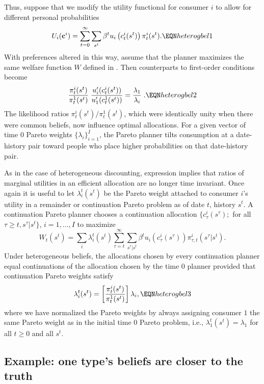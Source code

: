 Thus, suppose that we modify  the utility functional  for consumer $i$
to allow for different personal probabilities
$$ U_i({\bf c}^i) = \sum_{t=0}^\infty \sum_{s^t} \beta^t 
   u_i\left(c^i_t(s^t)\right)
\pi_t^i(s^t) .  \EQN heterogbel1 $$
With preferences altered in this way, assume that the planner
maximizes the same welfare function $W$ defined in .    Then  counterparts to first-order conditions  become
$$ {\frac{\pi_t^i(s^t)}{\pi_t^1(s^t)}} \;
{\frac{u_i^\prime(c^i_t(s^t))}{u_1^\prime(c^1_t(s^t))}}
 = {\frac{\lambda_1}{\lambda_i}} \; .
                                               \EQN heterogbel2 $$
The likelihood ratios $ \pi_t^i(s^t) / \pi_t^1(s^t) $, %
 which were identically unity when there were common beliefs, now influence optimal allocations.
For a given vector of time $0$  Pareto weights $\{\lambda_i\}_{i=1}^I$, the Pareto planner tilts consumption  at a date-history pair toward
people who place higher probabilities on that date-history pair.

As in the case of heterogeneous discounting, expression
 implies that ratios of marginal utilities
in an efficient allocation are no longer time invariant.
Once again it is useful to let $\lambda^t_i(s^t)$ be the
Pareto weight attached to consumer $i$'s utility in a
remainder or continuation Pareto problem as of date $t$, history $s^t$.  A continuation Pareto
planner chooses a continuation allocation
$\{c_{\tau}^i(s^\tau);$ for all $\tau\geq t,s^\tau | s^t\}$,
$i = 1, \ldots , I$  to maximize
$$ W_t(s^t) = \sum_i \lambda^t_i(s^t)
\sum_{\tau = t}^\infty \sum_{s^\tau | s^t}
\beta^t u_i(c_{\tau}^i(s^\tau)) \pi_{\tau,t}^i(s^\tau | s^t) .$$
Under heterogeneous
beliefs, the allocations chosen by every  continuation  planner  equal  continuations of the allocation chosen by the time $0$ planner provided that
 continuation Pareto weights satisfy
$$
\lambda^t_i(s^t) =  \left[ \pi_t^i(s^t) \over \pi_t^1(s^t) \right]
                    \lambda_i,       \EQN heterogbel3
$$
where we have normalized the Pareto weights
by always assigning consumer $1$ the same Pareto 
weight as in the initial time $0$ Pareto problem, i.e., 
$\lambda^t_1(s^t) = \lambda_1$ for all $t\geq0$ and
all $s^t$.


\subsection{Example: one type's beliefs are closer to the truth}
\label{sec:heterogbel_example}%

